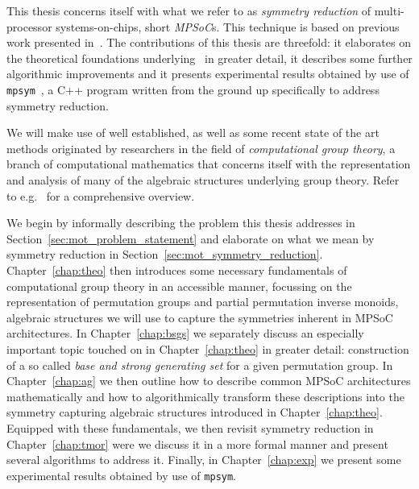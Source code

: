 This thesis concerns itself with what we refer to as \textit{symmetry
reduction} of multi-processor systems-on-chips, short \textit{MPSoC}s.  This
technique is based on previous work presented in~\cite{Goens}. The
contributions of this thesis are threefold: it elaborates on the theoretical
foundations underlying~\cite{Goens} in greater detail, it describes some
further algorithmic improvements and it presents experimental results obtained
by use of \texttt{mpsym}~\cite{mpsym}, a C++ program written from the ground up
specifically to address symmetry reduction.

We will make use of well established, as well as some recent state of the art
methods originated by researchers in the field of \textit{computational group
theory}, a branch of computational mathematics that concerns itself with the
representation and analysis of many of the algebraic structures underlying
group theory. Refer to e.g.~\cite{Holt} for a comprehensive overview.

We begin by informally describing the problem this thesis addresses in
Section~\ref{sec:mot_problem_statement} and elaborate on what we mean by
symmetry reduction in Section~\ref{sec:mot_symmetry_reduction}.
%
Chapter~\ref{chap:theo} then introduces some necessary fundamentals of
computational group theory in an accessible manner, focussing on the
representation of permutation groups and partial permutation
inverse monoids, algebraic structures we will use to capture the symmetries
inherent in MPSoC architectures.
%
In Chapter~\ref{chap:bsgs} we separately discuss an especially important topic
touched on in Chapter~\ref{chap:theo} in greater detail: construction of a so
called \textit{base and strong generating set} for a given permutation group.
%
In Chapter~\ref{chap:ag} we then outline how to describe common MPSoC
architectures mathematically and how to algorithmically transform these
descriptions into the symmetry capturing algebraic structures introduced in
Chapter~\ref{chap:theo}.
%
Equipped with these fundamentals, we then revisit symmetry reduction in
Chapter~\ref{chap:tmor} were we discuss it in a more formal manner and present
several algorithms to address it.
%
Finally, in Chapter~\ref{chap:exp} we present some experimental results
obtained by use of \texttt{mpsym}.
